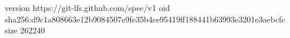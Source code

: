version https://git-lfs.github.com/spec/v1
oid sha256:d9c1a808663e12b9084507e9fe35b4ce95419ff188441b63993e3201e3aebcfc
size 262240
